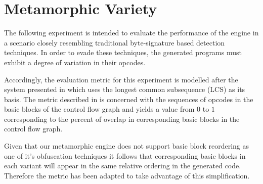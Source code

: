 \documentclass[finalcopy,short]{srpaper}
\begin{document}
    \section{Metamorphic Variety}
        
        The following experiment is intended to evaluate the performance of the
        engine in a scenario closely resembling traditional byte-signature based
        detection techniques. In order to evade these techniques, the generated
        programs must exhibit a degree of variation in their opcodes.

        Accordingly, the evaluation metric for this experiment is modelled after
        the system presented in \cite{cfg_lcs} which uses the longest common
        subsequence (LCS) as its basis. The metric described in \cite{cfg_lcs}
        is concerned with the sequences of opcodes in the basic blocks of the
        control flow graph and yields a value from $0$ to $1$ corresponding to
        the percent of overlap in corresponding basic blocks in the control flow
        graph.
        
        Given that our metamorphic engine does not support basic block
        reordering as one of it's obfuscation techniques it follows that
        corresponding basic blocks in each variant will appear in the same
        relative ordering in the generated code. Therefore the metric has been
        adapted to take advantage of this simplification.
\end{document}

